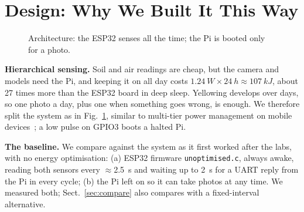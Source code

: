 \documentclass[runningheads]{llncs}
\begin{document}
\section{Design: Why We Built It This Way}

\begin{figure}[t]
\centering
{}
\caption{Architecture: the ESP32 senses all the time; the Pi is booted only for a photo.}
\label{fig:arch}
\end{figure}

\noindent\textbf{Hierarchical sensing.} Soil and air readings are cheap, but the camera and models need the Pi, and keeping it on all day costs $\SI{1.24}{W}\times\SI{24}{h}\approx\SI{107}{kJ}$, about 27 times more than the ESP32 board in deep sleep. Yellowing develops over days, so one photo a day, plus one when something goes wrong, is enough. We therefore split the system as in Fig.~\ref{fig:arch}, similar to multi-tier power management on mobile devices~\cite{turducken}; a low pulse on GPIO3 boots a halted Pi.

\noindent\textbf{The baseline.} We compare against the system as it first worked after the labs, with no energy optimisation: (a) ESP32 firmware \texttt{unoptimised.c}, always awake, reading both sensors every $\approx$\SI{2.5}{s} and waiting up to \SI{2}{s} for a UART reply from the Pi in every cycle; (b) the Pi left on so it can take photos at any time. We measured both; Sect.~\ref{sec:compare} also compares with a fixed-interval alternative.
\end{document}
